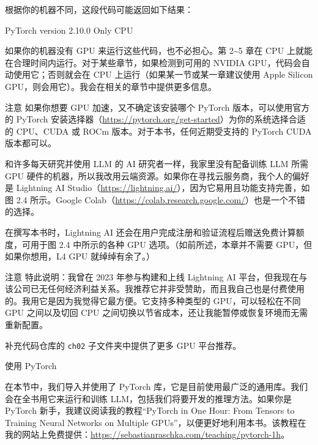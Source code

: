 根据你的机器不同，这段代码可能返回如下结果：

\begin{codebox}
PyTorch version 2.10.0
Only CPU
\end{codebox}

如果你的机器没有 GPU 来运行这些代码，也不必担心。第 2\textasciitilde{}5 章在 CPU 上就能在合理时间内运行。对于某些章节，如果检测到可用的 NVIDIA GPU，代码会自动使用它；否则就会在 CPU 上运行（如果某一节或某一章建议使用 Apple Silicon GPU，则会用它）。我会在相关的章节中提供更多信息。

\begin{myWarning}{注意}
 如果你想要 GPU 加速，又不确定该安装哪个 PyTorch 版本，可以使用官方的 PyTorch 安装选择器（\href{https://pytorch.org/get-started}{https://pytorch.org/get-started}）为你的系统选择合适的 CPU、CUDA 或 ROCm 版本。对于本书，任何近期受支持的 PyTorch CUDA 版本都可以。\end{myWarning}

和许多每天研究并使用 LLM 的 AI 研究者一样，我家里没有配备训练 LLM 所需 GPU 硬件的机器，所以我改用云端资源。如果你在寻找云服务商，我个人的偏好是 Lightning AI Studio（\href{https://lightning.ai/}{https://lightning.ai/}），因为它易用且功能支持完善，如图 2.4 所示。Google Colab（\href{https://colab.research.google.com/}{https://colab.research.google.com/}）也是一个不错的选择。


在撰写本书时，Lightning AI 还会在用户完成注册和验证流程后赠送免费计算额度，可用于图 2.4 中所示的各种 GPU 选项。（如前所述，本章并不需要 GPU，但如果你想用，L4 GPU 就绰绰有余了。）

\begin{myWarning}{注意}
 特此说明：我曾在 2023 年参与构建和上线 Lightning AI 平台，但我现在与该公司已无任何经济利益关系。我推荐它并非受赞助，而且我自己也是付费使用的。我用它是因为我觉得它最方便。它支持多种类型的 GPU，可以轻松在不同 GPU 之间以及切回 CPU 之间切换以节省成本，还让我能暂停或恢复环境而无需重新配置。\end{myWarning}

补充代码仓库的 \texttt{ch02} 子文件夹中提供了更多 GPU 平台推荐。

\begin{mySidebar}{使用 PyTorch}

在本节中，我们导入并使用了 PyTorch 库，它是目前使用最广泛的通用库。我们会在全书用它来运行和训练 LLM，包括我们将要开发的推理方法。如果你是 PyTorch 新手，我建议阅读我的教程“PyTorch in One Hour: From Tensors to Training Neural Networks on Multiple GPUs”，以便更好地利用本书。该教程在我的网站上免费提供：\href{https://sebastianraschka.com/teaching/pytorch-1h}{https://sebastianraschka.com/teaching/pytorch-1h}。

\end{mySidebar}

